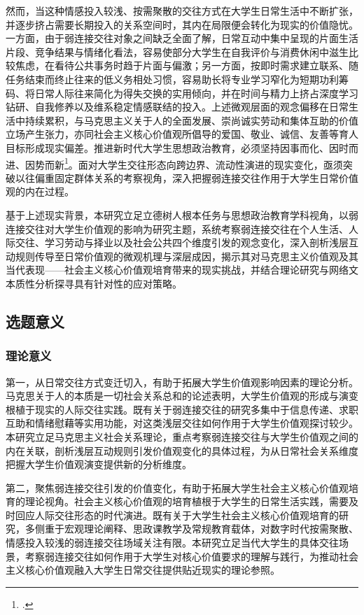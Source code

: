 然而，当这种情感投入较浅、按需聚散的交往方式在大学生日常生活中不断扩张，并逐步挤占需要长期投入的关系空间时，其内在局限便会转化为现实的价值隐忧。一方面，由于弱连接交往对象之间缺乏全面了解，日常互动中集中呈现的片面生活片段、竞争结果与情绪化看法，容易使部分大学生在自我评价与消费休闲中滋生比较焦虑，在看待公共事务时趋于片面与偏激；另一方面，按即时需求建立联系、随任务结束而终止往来的低义务相处习惯，容易助长将专业学习窄化为短期功利筹码、将日常人际往来简化为得失交换的实用倾向，并在时间与精力上挤占深度学习钻研、自我修养以及维系稳定情感联结的投入。上述微观层面的观念偏移在日常生活中持续累积，与马克思主义关于人的全面发展、崇尚诚实劳动和集体互助的价值立场产生张力，亦同社会主义核心价值观所倡导的爱国、敬业、诚信、友善等育人目标形成现实偏差。推进新时代大学生思想政治教育，必须坚持因事而化、因时而进、因势而新\footcite{Xi2022}。面对大学生交往形态向跨边界、流动性演进的现实变化，亟须突破以往偏重固定群体关系的考察视角，深入把握弱连接交往作用于大学生日常价值观的内在过程。

基于上述现实背景，本研究立足立德树人根本任务与思想政治教育学科视角，以弱连接交往对大学生价值观的影响为研究主题，系统考察弱连接交往在个人生活、人际交往、学习劳动与择业以及社会公共四个维度引发的观念变化，深入剖析浅层互动规则传导至日常价值观的微观机理与深层成因，揭示其对马克思主义价值观及其当代表现——社会主义核心价值观培育带来的现实挑战，并结合理论研究与网络文本质性分析探寻具有针对性的应对策略。
\subsection{选题意义}

\subsubsection{理论意义}

第一，从日常交往方式变迁切入，有助于拓展大学生价值观影响因素的理论分析。马克思关于人的本质是一切社会关系总和的论述表明，大学生价值观的形成与演变根植于现实的人际交往实践。既有关于弱连接交往的研究多集中于信息传递、求职互助和情绪慰藉等实用功能，对这类浅层交往如何作用于大学生价值观探讨较少。本研究立足马克思主义社会关系理论，重点考察弱连接交往与大学生价值观之间的内在关联，剖析浅层互动规则引发价值观变化的具体过程，为从日常社会关系维度把握大学生价值观演变提供新的分析维度。

第二，聚焦弱连接交往引发的价值变化，有助于拓展大学生社会主义核心价值观培育的理论视角。社会主义核心价值观的培育植根于大学生的日常生活实践，需要及时回应人际交往形态的时代演进。既有关于大学生社会主义核心价值观培育的研究，多侧重于宏观理论阐释、思政课教学及常规教育载体，对数字时代按需聚散、情感投入较浅的弱连接交往场域关注有限。本研究立足当代大学生的具体交往场景，考察弱连接交往如何作用于大学生对核心价值要求的理解与践行，为推动社会主义核心价值观融入大学生日常交往提供贴近现实的理论参照。
